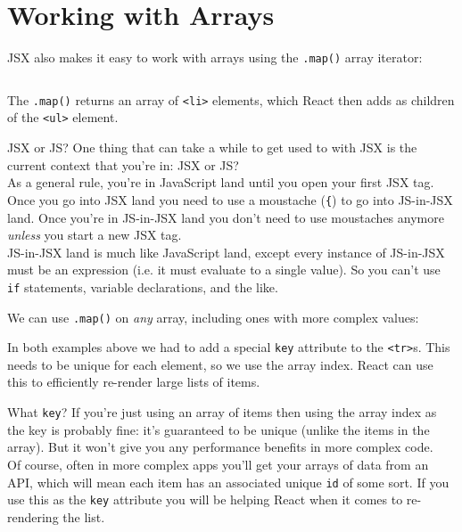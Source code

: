 \section{Working with Arrays}


JSX also makes it easy to work with arrays using the \texttt{.map()} array iterator:

\inputminted{jsx}{02-jsx/figures/13-map.jsx}

The \texttt{.map()} returns an array of \texttt{<li>} elements, which React then adds as children of the \texttt{<ul>} element.

\begin{infobox}{JSX or JS?}
    One thing that can take a while to get used to with JSX is the current context that you're in: JSX or JS?
    \\

    As a general rule, you're in JavaScript land until you open your first JSX tag. Once you go into JSX land you need to use a moustache (\texttt{\{}) to go into JS-in-JSX land. Once you're in JS-in-JSX land you don't need to use moustaches anymore \textit{unless} you start a new JSX tag.
    \\

    JS-in-JSX land is much like JavaScript land, except every instance of JS-in-JSX must be an expression (i.e. it must evaluate to a single value). So you can't use \texttt{if} statements, variable declarations, and the like.

\end{infobox}


\pagebreak


We can use \texttt{.map()} on \textit{any} array, including ones with more complex values:


In both examples above we had to add a special \texttt{key} attribute to the \texttt{<tr>}s. This needs to be unique for each element, so we use the array index. React can use this to efficiently re-render large lists of items.

\begin{infobox}{What \texttt{key}?}
    If you're just using an array of items then using the array index as the key is probably fine: it's guaranteed to be unique (unlike the items in the array). But it won't give you any performance benefits in more complex code.
    \\

    Of course, often in more complex apps you'll get your arrays of data from an API, which will mean each item has an associated unique \texttt{id} of some sort. If you use this as the \texttt{key} attribute you will be helping React when it comes to re-rendering the list.
\end{infobox}



